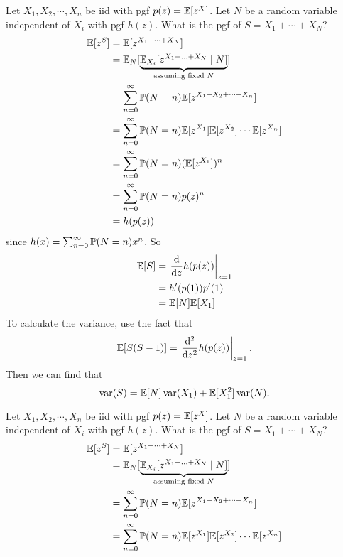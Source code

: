 \begin{note}
  \begin{field}
    \begin{eg}
    Let $X_1, X_2, \cdots, X_n$ be iid with pgf $p(z) = \E[z^X]$. Let $N$ be a random variable independent of $X_i$ with pgf $h(z)$. What is the pgf of $S = X_1 + \cdots + X_N$?
    \begin{align*}
      \E[z^{S}] &= \E[z^{X_1 + \cdots + X_N}]\\
      &= \E_N[\underbrace{\E_{X_i}[z^{X_1 + \ldots + X_N}\mid N]}_{\text{assuming fixed }N}]\\
      &= \sum_{n = 0}^\infty \P(N = n) \E[z^{X_1 + X_2 + \cdots + X_n}]\\
      &= \sum_{n = 0}^\infty \P(N = n) \E[z^{X_1}] \E[z^{X_2}]\cdots\E[z^{X_n}]\\
      &= \sum_{n = 0}^\infty \P(N = n) (\E[z^{X_1}])^n\\
      &= \sum_{n = 0}^\infty \P(N = n) p(z)^n \\
      &= h(p(z))
    \end{align*}
    since $h(x) = \sum_{n = 0}^\infty \P(N = n) x^n$.
    So
    \begin{align*}
      \E[S] &= \left.\frac{\d }{\d z}h(p(z))\right|_{z = 1}\\
      &= h'(p(1))p'(1)\\
      &= \E[N]\E[X_1]
    \end{align*}
    To calculate the variance, use the fact that
    \[
      \E[S(S - 1)] = \left.\frac{\d ^2}{\d z^2}h(p(z))\right|_{z = 1}.
    \]
    Then we can find that
    \[
      \var (S) = \E[N]\var(X_1) + \E[X_1^2]\var(N).
    \]
    \end{eg}
  \end{field}
  \begin{field}
    \begin{eg}
    Let $X_1, X_2, \cdots, X_n$ be iid with pgf $p(z) = \E[z^X]$. Let $N$ be a random variable independent of $X_i$ with pgf $h(z)$. What is the pgf of $S = X_1 + \cdots + X_N$?
    \begin{align*}
      \E[z^{S}] &= \E[z^{X_1 + \cdots + X_N}]\\
      &= \E_N[\underbrace{\E_{X_i}[z^{X_1 + \ldots + X_N}\mid N]}_{\text{assuming fixed }N}]\\
      &= \sum_{n = 0}^\infty \P(N = n) \E[z^{X_1 + X_2 + \cdots + X_n}]\\
      &= \sum_{n = 0}^\infty \P(N = n) \E[z^{X_1}] \E[z^{X_2}]\cdots\E[z^{X_n}]\\

\end{align*}
\end{eg}
\end{field}
\end{note}
